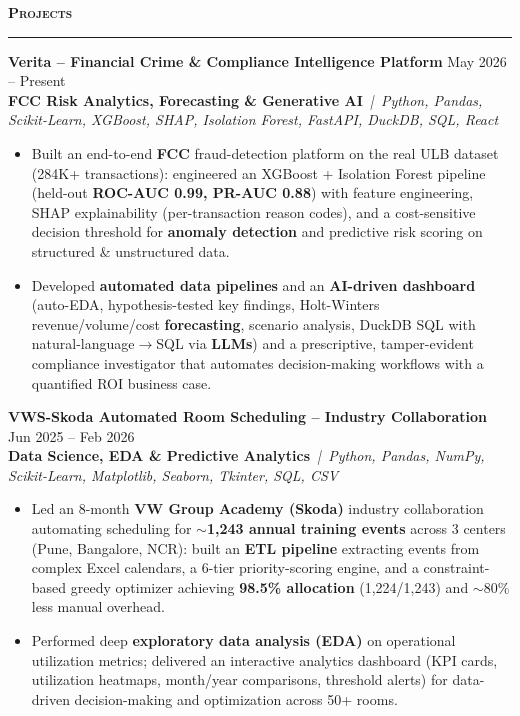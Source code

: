 \documentclass[a4paper,10pt]{article}
\newcommand{\sectionHeader}[2]{%
  \vspace{5pt}%
  \noindent%
  {\normalsize\bfseries\color{HeaderDark}#2\enspace\textsc{#1}}%
  \\[-6pt]%
  {\color{SectionLine}\rule{\textwidth}{1pt}}%
  \vspace{1pt}\par%
}
\newcommand{\projectEntry}[4]{%
  \vspace{1pt}%
  \noindent\textbf{\color{HeaderDark}#1} \hfill {\small\color{SubText}#2}\\[-4pt]%
  {\scriptsize\color{AccentTeal}\textbf{#3}} {\scriptsize\color{TechTag}\textit{\,|\, #4}}%
  \vspace{0pt}\par%
}
\begin{document}
\sectionHeader{Projects}{\faProjectDiagram}

\projectEntry{Verita -- Financial Crime \& Compliance Intelligence Platform}
  {May 2026 -- Present}
  {FCC Risk Analytics, Forecasting \& Generative AI}
  {Python, Pandas, Scikit-Learn, XGBoost, SHAP, Isolation Forest, FastAPI, DuckDB, SQL, React}

\begin{itemize}[leftmargin=14pt, itemsep=0pt, parsep=0pt, topsep=1pt, label={\color{BulletColor}\textbf{--}}]
  \item {\small Built an end-to-end \textbf{FCC} fraud-detection platform on the real ULB dataset (284K+ transactions): engineered an XGBoost + Isolation Forest pipeline (held-out \textbf{ROC-AUC 0.99, PR-AUC 0.88}) with feature engineering, SHAP explainability (per-transaction reason codes), and a cost-sensitive decision threshold for \textbf{anomaly detection} and predictive risk scoring on structured \& unstructured data.}
  \item {\small Developed \textbf{automated data pipelines} and an \textbf{AI-driven dashboard} (auto-EDA, hypothesis-tested key findings, Holt-Winters revenue/volume/cost \textbf{forecasting}, scenario analysis, DuckDB SQL with natural-language$\rightarrow$SQL via \textbf{LLMs}) and a prescriptive, tamper-evident compliance investigator that automates decision-making workflows with a quantified ROI business case.}
\end{itemize}

\vspace{1pt}

\projectEntry{VWS-Skoda Automated Room Scheduling -- Industry Collaboration}
  {Jun 2025 -- Feb 2026}
  {Data Science, EDA \& Predictive Analytics}
  {Python, Pandas, NumPy, Scikit-Learn, Matplotlib, Seaborn, Tkinter, SQL, CSV}

\begin{itemize}[leftmargin=14pt, itemsep=0pt, parsep=0pt, topsep=1pt, label={\color{BulletColor}\textbf{--}}]
  \item {\small Led an 8-month \textbf{VW Group Academy (Skoda)} industry collaboration automating scheduling for \textbf{$\sim$1,243 annual training events} across 3 centers (Pune, Bangalore, NCR): built an \textbf{ETL pipeline} extracting events from complex Excel calendars, a 6-tier priority-scoring engine, and a constraint-based greedy optimizer achieving \textbf{98.5\% allocation} (1,224/1,243) and $\sim$80\% less manual overhead.}
  \item {\small Performed deep \textbf{exploratory data analysis (EDA)} on operational utilization metrics; delivered an interactive analytics dashboard (KPI cards, utilization heatmaps, month/year comparisons, threshold alerts) for data-driven decision-making and optimization across 50+ rooms.}
\end{itemize}
\end{document}
